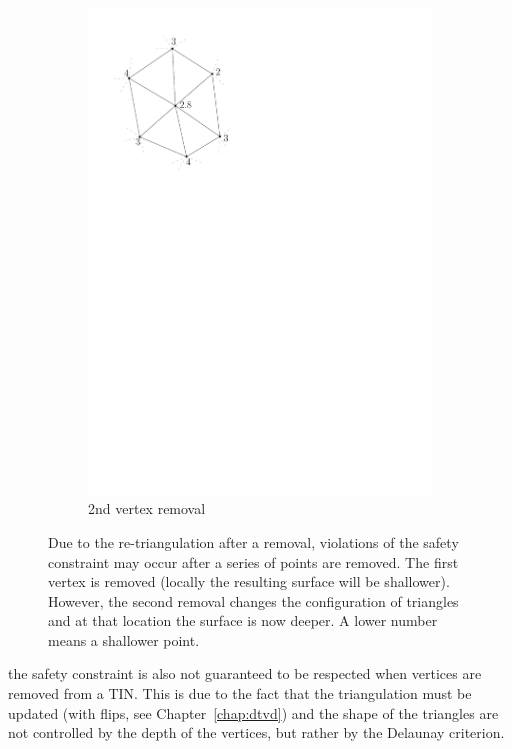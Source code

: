\begin{figure}
\begin{subfigure}[b]{0.3\linewidth}
    \includegraphics[width=\textwidth,page=3]{figs/simpfail.pdf}
    \caption{2nd vertex removal}\label{fig:simpfail:c}
  \end{subfigure}
\caption{Due to the re-triangulation after a removal, violations of the safety constraint may occur after a series of points are removed. The first vertex is removed (locally the resulting surface will be shallower). However, the second removal changes the configuration of triangles and at that location the surface is now deeper. A lower number means a shallower point.}
\label{fig:simpfail}
\end{figure}
the safety constraint is also not guaranteed to be respected when vertices are removed from a TIN.
This is due to the fact that the triangulation must be updated (with flips, see Chapter~\ref{chap:dtvd}) and the shape of the triangles are not controlled by the depth of the vertices, but rather by the Delaunay criterion.


